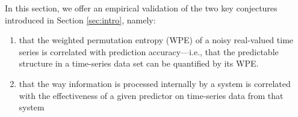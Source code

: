 


In this section, we offer an empirical validation of the two key
conjectures introduced in Section \ref{sec:intro}, namely:

\begin{enumerate}

\item that the weighted permutation entropy (WPE) of a noisy
  real-valued time series is correlated with prediction
  accuracy---i.e., that the predictable structure in a time-series
  data set can be quantified by its WPE.



\item that the way information is processed internally by a system is
  correlated with the effectiveness of a given predictor on
  time-series data from that system



\end{enumerate}

